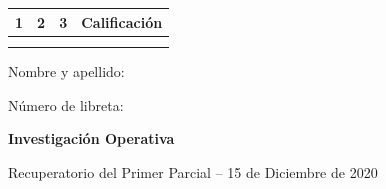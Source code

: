 \documentclass[a4paper,oneside,12pt]{amsart}
\newcommand{\nombremateria}
{Investigaci\'on Operativa}
\newcommand{\numeroparcial}
    { Recuperatorio del Primer Parcial }
\newcommand{\fecha}
    {15 de Diciembre de 2020}
\begin{document}
\hfill \hfill
\begin{tabular}[c]{|c|c|c|c|}
\hline 
1 & 2 & 3 & Calificaci\'on \\ \hline \hline
\hspace{1.2 cm} & \hspace{1.2 cm} & \hspace{1.2 cm} &\hspace{1.5 cm} \\
\hspace{1.2 cm} & \hspace{1.2 cm} & \hspace{1.2 cm} &\hspace{1.5 cm} \\ \hline

\end{tabular}

\vspace{-1cm}

\noindent Nombre y apellido:

\vspace{0.2cm}

\noindent Número de libreta:

\noindent \hrulefill 

\smallskip
\renewcommand{\baselinestretch}{1.1}

\begin{center}
	\large \textbf{\nombremateria} 
	
	\numeroparcial -- \fecha
\end{center}

\vspace{.6cm}
\renewcommand{\theenumi}{\textbf{\arabic{enumi}}}

\end{document}
